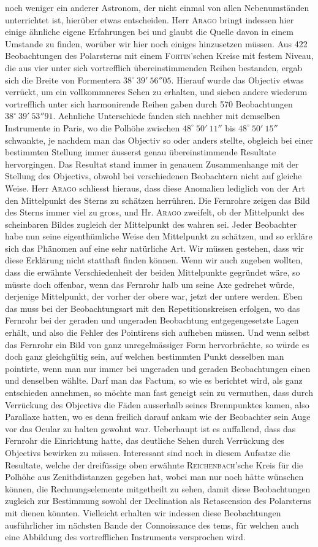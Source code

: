 noch weniger ein anderer Astronom, der nicht einmal von allen Nebenumständen unterrichtet ist, hierüber etwas entscheiden. Herr \textsc{Arago} bringt indessen hier einige ähnliche eigene Erfahrungen bei und glaubt die Quelle davon in einem Umstande zu finden, worüber wir hier noch einiges hinzusetzen müssen. Aus 422 Beobachtungen des Polarsterns mit einem \textsc{Fortin}'schen Kreise mit festem Niveau, die aus vier unter sich vortrefflich übereinstimmenden Reihen bestanden, ergab sich die Breite von Formentera $38^\circ\ 39'\ 56''05$. Hierauf wurde das Objectiv etwas verrückt, um ein vollkommneres Sehen zu erhalten, und sieben andere wiederum vortrefflich unter sich harmonirende Reihen gaben durch 570 Beobachtungen $38^\circ\ 39'\ 53''91$. Aehnliche Unterschiede fanden sich nachher mit demselben Instrumente in Paris, wo die Polhöhe zwischen $48^\circ\ 50'\ 11''$ bis $48^\circ\ 50'\ 15''$ schwankte, je nachdem man das Objectiv so oder anders stellte, obgleich bei einer bestimmten Stellung immer äusserst genau übereinstimmende Resultate hervorgingen. Das Resultat stand immer in genauem Zusammenhange mit der Stellung des Objectivs, obwohl bei verschiedenen Beobachtern nicht auf gleiche Weise. Herr \textsc{Arago} schliesst hieraus, dass diese Anomalien lediglich von der Art den Mittelpunkt des Sterns zu schätzen herrühren. Die Fernrohre zeigen das Bild des Sterns immer viel zu gross, und Hr. \textsc{Arago} zweifelt, ob der Mittelpunkt des scheinbaren Bildes zugleich der Mittelpunkt des wahren sei. Jeder Beobachter habe nun seine eigenthümliche Weise den Mittelpunkt zu schätzen, und so erkläre sich das Phänomen auf eine sehr natürliche Art. Wir müssen gestehen, dass wir diese Erklärung nicht statthaft finden können. Wenn wir auch zugeben wollten, dass die erwähnte Verschiedenheit der beiden Mittelpunkte gegründet wäre, so müsste doch offenbar, wenn das Fernrohr halb um seine Axe gedrehet würde, derjenige Mittelpunkt, der vorher der obere war, jetzt der untere werden. Eben das muss bei der Beobachtungsart mit den Repetitionskreisen erfolgen, wo das Fernrohr bei der geraden und ungeraden Beobachtung entgegengesetzte Lagen erhält, und also die Fehler des Pointirens sich aufheben müssen. Und wenn selbst das Fernrohr ein Bild von ganz unregelmässiger Form hervorbrächte, so würde es doch ganz gleichgültig sein, auf welchen bestimmten Punkt desselben man pointirte, wenn man nur immer bei ungeraden und geraden Beobachtungen einen und denselben wählte. Darf man das Factum, so wie es berichtet wird, als ganz entschieden annehmen, so möchte man fast geneigt sein zu vermuthen, dass durch Verrückung des Objectivs die Fäden ausserhalb seines Brennpunktes kamen, also Parallaxe hatten, wo es denn freilich darauf ankam wie der Beobachter sein Auge vor das Ocular zu halten gewohnt war. Ueberhaupt ist es auffallend, dass das Fernrohr die Einrichtung hatte, das deutliche Sehen durch Verrückung des Objectivs bewirken zu müssen. Interessant sind noch in diesem Aufsatze die Resultate, welche der dreifüssige oben erwähnte \textsc{Reichenbach}'sche Kreis für die Polhöhe aus Zenithdistanzen gegeben hat, wobei man nur noch hätte wünschen können, die Rechnungselemente mitgetheilt zu sehen, damit diese Beobachtungen zugleich zur Bestimmung sowohl der Declination als Retascension des Polarsterns mit dienen könnten. Vielleicht erhalten wir indessen diese Beobachtungen ausführlicher im nächsten Bande der Connoissance des tems, für welchen auch eine Abbildung des vortrefflichen Instruments versprochen wird.

